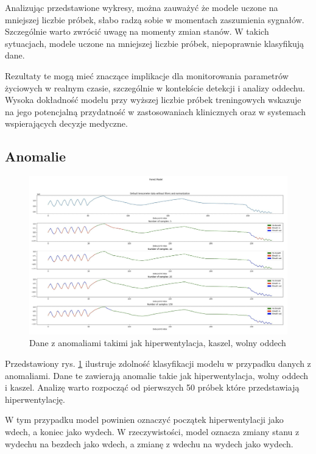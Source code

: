 \documentclass{article}
\begin{document}
Analizując przedstawione wykresy, można zauważyć że modele uczone na mniejszej liczbie próbek, słabo radzą sobie w momentach zaszumienia sygnałów. Szczególnie warto zwrócić uwagę na momenty zmian stanów. W takich sytuacjach, modele uczone na mniejszej liczbie próbek, niepoprawnie klasyfikują dane.

Rezultaty te mogą mieć znaczące implikacje dla monitorowania parametrów życiowych w realnym czasie, szczególnie w kontekście detekcji i analizy oddechu. Wysoka dokładność modelu przy wyższej liczbie próbek treningowych wskazuje na jego potencjalną przydatność w zastosowaniach klinicznych oraz w systemach wspierających decyzje medyczne.

\subsection{Anomalie}

\begin{figure}[H]
    \centering
    \includegraphics[width=\textwidth]{las_losowy/anomalie.png}
    \caption{Dane z anomaliami takimi jak hiperwentylacja, kaszel, wolny oddech}
    \label{fig:data_chart5}
\end{figure}

Przedstawiony rys. \ref{fig:data_chart5} ilustruje zdolność klasyfikacji modelu w przypadku danych z anomaliami. Dane te zawierają anomalie takie jak hiperwentylacja, wolny oddech i kaszel. Analizę warto rozpocząć od pierwszych 50 próbek które przedstawiają hiperwentylację. 

W tym przypadku model powinien oznaczyć początek hiperwentylacji jako wdech, a koniec jako wydech. W rzeczywistości, model oznacza zmiany stanu z wydechu na bezdech jako wdech, a zmianę z wdechu na wydech jako wydech. 
\end{document}
